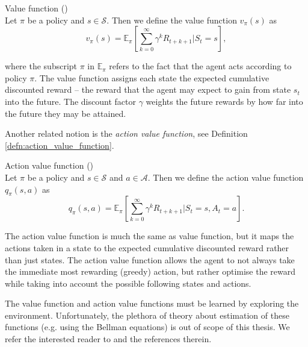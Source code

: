 \begin{defn}{\normalfont Value function} \label{defn:value_function}
{\normalfont (\cite[Section 3.5]{sutton2018reinforcement})}
\\
Let $\pi$ be a policy and $s \in \mathcal{S}$. Then we define the value function $v_{\pi}(s)$ as
\begin{equation*}
v_{\pi}(s)=\mathbb{E}_{\pi} \left[ \sum_{k=0}^{\infty} \gamma^k R_{t+k+1} | S_t=s \right],
\end{equation*}
\end{defn}
where the subscript $\pi$ in $\mathbb{E}_{\pi}$ refers to the fact that the agent acts according to policy $\pi$.
The value function assigns each state the expected cumulative discounted reward -- the reward that the agent may expect to gain from state $s_t$ into the future. The discount factor $\gamma$ weights the future rewards by how far into the future they may be attained.

Another related notion is the \textit{action value function}, see Definition \ref{defn:action_value_function}.

\begin{defn}{\normalfont Action value function} \label{defn:action_value_function}
{\normalfont (\cite[Section 3.5]{sutton2018reinforcement})}
\\
Let $\pi$ be a policy and $s \in \mathcal{S}$ and $a \in \mathcal{A}$. Then we define the action value function $q_{\pi}(s,a)$ as
\begin{equation*}
 q_{\pi}(s,a)=\mathbb{E}_{\pi} \left[ \sum_{k=0}^{\infty} \gamma^k R_{t+k+1} | S_t=s, A_t=a \right].
\end{equation*}
\end{defn}
The action value function is much the same as value function, but it maps the actions taken in a state to the expected cumulative discounted reward rather than just states. The action value function allows the agent to not always take the immediate most rewarding (greedy) action, but rather optimise the reward while taking into account the possible following states and actions. 

The value function and action value functions must be learned by exploring the environment. Unfortunately, the plethora of theory about estimation of these functions (e.g. using the Bellman equations) is out of scope of this thesis. We refer the interested reader to \cite[Section 3.5.]{sutton2018reinforcement} and the references therein.

